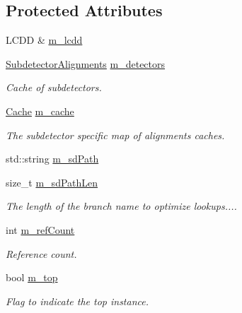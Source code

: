 \subsection*{Protected Attributes}
\begin{DoxyCompactItemize}
\item 
LCDD \& \hyperlink{class_d_d4hep_1_1_alignments_1_1_global_alignment_cache_af1d0806e8ffced7c5d0f1438f58a6133}{m\_\-lcdd}
\item 
\hyperlink{class_d_d4hep_1_1_alignments_1_1_global_alignment_cache_abedb85cf969b8fb161695f5eca9717bc}{SubdetectorAlignments} \hyperlink{class_d_d4hep_1_1_alignments_1_1_global_alignment_cache_abf497ee00ee5dbe22b05c75041c0e2c8}{m\_\-detectors}
\begin{DoxyCompactList}\small\item\em Cache of subdetectors. \item\end{DoxyCompactList}\item 
\hyperlink{class_d_d4hep_1_1_alignments_1_1_global_alignment_cache_a51cc6e8b7d9d85cfc296e8db7f360604}{Cache} \hyperlink{class_d_d4hep_1_1_alignments_1_1_global_alignment_cache_a00b2ed5078af798d881bf59d8a30bed3}{m\_\-cache}
\begin{DoxyCompactList}\small\item\em The subdetector specific map of alignments caches. \item\end{DoxyCompactList}\item 
std::string \hyperlink{class_d_d4hep_1_1_alignments_1_1_global_alignment_cache_a24050f584cfe000084802279065b8ee9}{m\_\-sdPath}
\item 
size\_\-t \hyperlink{class_d_d4hep_1_1_alignments_1_1_global_alignment_cache_a8adea69d0bd2c58caa97638937cafabf}{m\_\-sdPathLen}
\begin{DoxyCompactList}\small\item\em The length of the branch name to optimize lookups.... \item\end{DoxyCompactList}\item 
int \hyperlink{class_d_d4hep_1_1_alignments_1_1_global_alignment_cache_ac6889cb128e532b71a56ce2a2fdd305f}{m\_\-refCount}
\begin{DoxyCompactList}\small\item\em Reference count. \item\end{DoxyCompactList}\item 
bool \hyperlink{class_d_d4hep_1_1_alignments_1_1_global_alignment_cache_ad8ec69133c554aee9f43b7952d29c65e}{m\_\-top}
\begin{DoxyCompactList}\small\item\em Flag to indicate the top instance. \item\end{DoxyCompactList}\end{DoxyCompactItemize}
